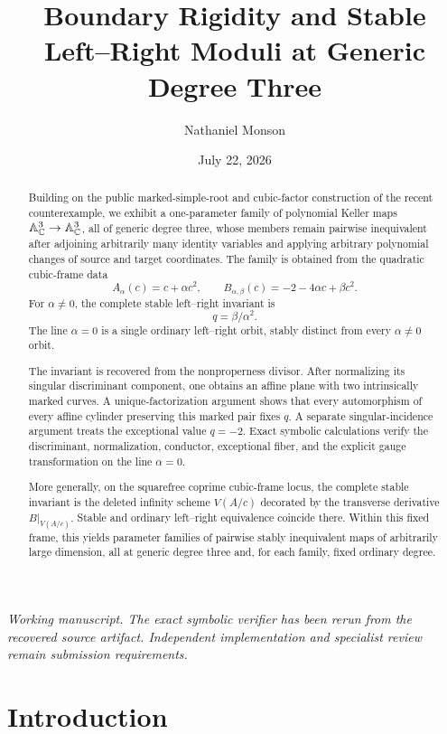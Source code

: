 \documentclass[11pt,reqno]{amsart}
\title[Boundary rigidity and stable moduli]{Boundary Rigidity and Stable
Left--Right Moduli at Generic Degree Three}
\author{Nathaniel Monson}
\date{July 22, 2026}
\begin{document}
\begin{abstract}
Building on the public marked-simple-root and cubic-factor construction of
the recent counterexample, we exhibit a one-parameter family of polynomial Keller maps
\(\mathbb A^3_{\mathbb C}\to\mathbb A^3_{\mathbb C}\), all of generic degree three, whose members remain
pairwise inequivalent after adjoining arbitrarily many identity variables and
applying arbitrary polynomial changes of source and target coordinates.
The family is obtained from the quadratic cubic-frame data
\[
A_\alpha(c)=c+\alpha c^2,\qquad
B_{\alpha,\beta}(c)=-2-4\alpha c+\beta c^2.
\]
For \(\alpha\ne0\), the complete stable left--right invariant is
\[
q=\beta/\alpha^2.
\]
The line \(\alpha=0\) is a single ordinary left--right orbit, stably distinct
from every \(\alpha\ne0\) orbit.

The invariant is recovered from the nonproperness divisor.  After normalizing
its singular discriminant component, one obtains an affine plane with two
intrinsically marked curves.  A unique-factorization argument
shows that every automorphism of every affine cylinder preserving this marked
pair fixes \(q\).  A separate singular-incidence argument treats the
exceptional value \(q=-2\).  Exact symbolic calculations verify the
discriminant, normalization, conductor, exceptional fiber, and the explicit
gauge transformation on the line \(\alpha=0\).

More generally, on the squarefree coprime cubic-frame locus, the complete
stable invariant is the deleted infinity scheme \(V(A/c)\) decorated by the
transverse derivative \(B|_{V(A/c)}\).  Stable and ordinary left--right
equivalence coincide there.  Within this fixed frame, this yields parameter
families of pairwise stably inequivalent maps of arbitrarily large dimension,
all at generic degree three and, for each family, fixed ordinary degree.
\end{abstract}

\maketitle

\begin{center}
\small\emph{Working manuscript.  The exact symbolic verifier has been rerun
from the recovered source artifact.  Independent implementation and
specialist review remain submission requirements.}
\end{center}

\section{Introduction}
\label{sec:introduction}
\end{document}
